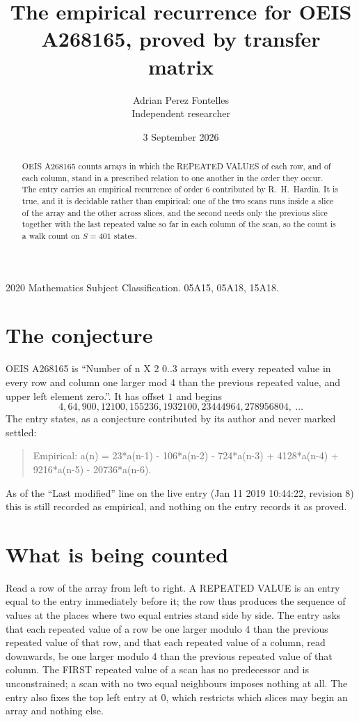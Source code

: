 \documentclass[11pt,a4paper]{article}
\title{The empirical recurrence for OEIS A268165, proved by transfer matrix}
\author{Adrian Perez Fontelles\\ \small Independent researcher}
\date{3 September 2026}
\theoremstyle{plain}
\theoremstyle{definition}
\begin{document}
\maketitle

\begin{abstract}
OEIS A268165 counts arrays in which the REPEATED VALUES of each row, and of each column, stand in a
prescribed relation to one another in the order they occur. The entry carries an empirical
recurrence of order $6$ contributed by R.~H.~Hardin. It is true, and it is decidable
rather than empirical: one of the two scans runs inside a slice of the array and the other
across slices, and the second needs only the previous slice together with the last repeated
value so far in each column of the scan, so the count is a walk count on $S=401$ states.
\end{abstract}

\noindent\small 2020 Mathematics Subject Classification. 05A15, 05A18, 15A18.\normalsize

\section{The conjecture}

OEIS A268165 is ``Number of n X 2 0..3 arrays with every repeated value in every row and column one larger mod 4 than the previous repeated value, and upper left element zero.''. It has offset $1$ and begins
\[
4, 64, 900, 12100, 155236, 1932100, 23444964, 278956804,\ \dots
\]
The entry states, as a conjecture contributed by its author and never marked settled:
\begin{quote}
Empirical: a(n) = 23*a(n-1) - 106*a(n-2) - 724*a(n-3) + 4128*a(n-4) + 9216*a(n-5) - 20736*a(n-6).
\end{quote}
As of the ``Last modified'' line on the live entry (Jan 11 2019 10:44:22, revision 8) this is still
recorded as empirical, and nothing on the entry records it as proved.

\section{What is being counted}

Read a row of the array from left to right. A REPEATED VALUE is an entry equal to the entry
immediately before it; the row thus produces the sequence of values at the places where two
equal entries stand side by side. The entry asks that each repeated value of a row be
one larger modulo 4 than the previous repeated value of that row, and that each repeated value of a column,
read downwards, be one larger modulo 4 than the previous repeated value of that column. The FIRST repeated
value of a scan has no predecessor and is unconstrained; a scan with no two equal neighbours
imposes nothing at all. The entry also fixes the top left entry at $0$, which restricts which slices may begin an array and nothing else.
\end{document}
